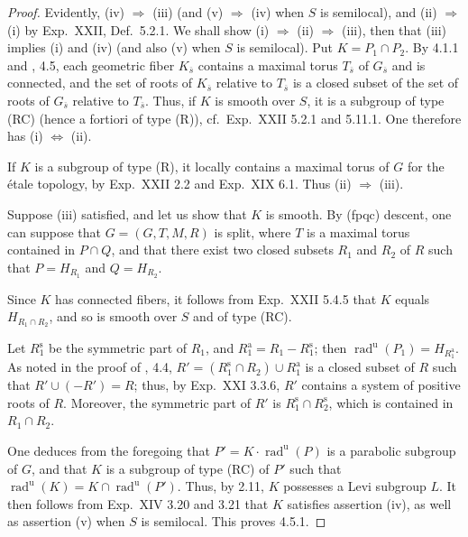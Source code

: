 \begin{proof}\footnotemark[23]
Evidently, (iv) $\Rightarrow$ (iii) (and (v) $\Rightarrow$ (iv) when $S$ is semilocal), and (ii) $\Rightarrow$ (i) by Exp.~XXII, Def.~5.2.1. We shall show (i) $\Rightarrow$ (ii) $\Rightarrow$ (iii), then that (iii) implies (i) and (iv) (and also (v) when $S$ is semilocal). Put $K=P_1\cap P_2$. By 4.1.1 and \cite{BT65}, 4.5, each geometric fiber $K_{\overline s}$ contains a maximal torus $T_{\overline s}$ of $G_{\overline s}$ and is connected, and the set of roots of $K_{\overline s}$ relative to $T_{\overline s}$ is a closed subset of the set of roots of $G_{\overline s}$ relative to $T_{\overline s}$. Thus, if $K$ is smooth over $S$, it is a subgroup of type (RC) (hence a fortiori of type (R)), cf.~Exp.~XXII 5.2.1 and 5.11.1. One therefore has (i) $\Leftrightarrow$ (ii).

If $K$ is a subgroup of type (R), it locally contains a maximal torus of $G$ for the \'etale topology, by Exp.~XXII 2.2 and Exp.~XIX 6.1. Thus (ii) $\Rightarrow$ (iii).

Suppose (iii) satisfied, and let us show that $K$ is smooth. By (fpqc) descent, one can suppose that $G=(G,T,M,R)$ is split, where $T$ is a maximal torus contained in $P\cap Q$, and that there exist two closed subsets $R_1$ and $R_2$ of $R$ such that $P=H_{R_1}$ and $Q=H_{R_2}$.

Since $K$ has connected fibers, it follows from Exp.~XXII 5.4.5 that $K$ equals $H_{R_1\cap R_2}$, and so is smooth over $S$ and of type (RC).

Let $R_1^{\mathrm s}$ be the symmetric part of $R_1$, and $R_1^{\mathrm a}=R_1-R_1^{\mathrm s}$; then $\operatorname{rad}^{\mathrm u}(P_1)=H_{R_1^{\mathrm a}}$. As noted in the proof of \cite{BT65}, 4.4, $R'=(R_1^{\mathrm s}\cap R_2)\cup R_1^{\mathrm a}$ is a closed subset of $R$ such that $R'\cup(-R')=R$; thus, by Exp.~XXI 3.3.6, $R'$ contains a system of positive roots of $R$. Moreover, the symmetric part of $R'$ is $R_1^{\mathrm s}\cap R_2^{\mathrm s}$, which is contained in $R_1\cap R_2$.

One deduces from the foregoing that $P'=K\cdot\operatorname{rad}^{\mathrm u}(P)$ is a parabolic subgroup of $G$, and that $K$ is a subgroup of type (RC) of $P'$ such that $\operatorname{rad}^{\mathrm u}(K)=K\cap\operatorname{rad}^{\mathrm u}(P')$. Thus, by 2.11, $K$ possesses a Levi subgroup $L$. It then follows from Exp.~XIV 3.20 and 3.21 that $K$ satisfies assertion (iv), as well as assertion (v) when $S$ is semilocal. This proves 4.5.1.
\end{proof}
